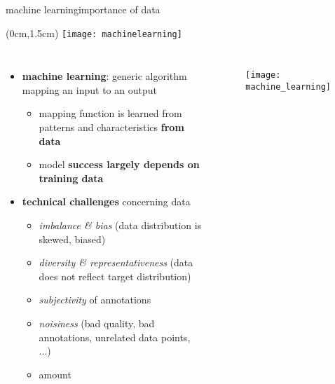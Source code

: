 \begin{frame}{machine learning}{importance of data}
    \vspace{-5mm}
    \begin{textblock*}{100mm}(0cm,1.5cm)
        \texttt{[image: machinelearning]}
    \end{textblock*}           
    
    \begin{columns}
    \begin{itemize}
 
        \item<1->   \textbf{machine learning}: generic algorithm mapping an input to an output
            \begin{itemize}
                \item<2->   mapping function is learned from patterns and characteristics \textbf{from data}
                \item<2->[$\Rightarrow$]   model \textbf{success largely depends on training data}
                
            \end{itemize}
        \bigskip
        \item<3->   \textbf{technical challenges} concerning data
            \begin{itemize}
                \item   \textit{imbalance \& bias} (data distribution is skewed, biased)
                \item   \textit{diversity \& representativeness} (data does not reflect target distribution)
                \item   \textit{subjectivity} of annotations
                \item   \textit{noisiness} (bad quality, bad annotations, unrelated data points, ...)
                \item   amount
            \end{itemize}
    \end{itemize}
        \begin{figure}
            \texttt{[image: machine\_learning]}
        \end{figure}
    \end{columns}
\end{frame}


